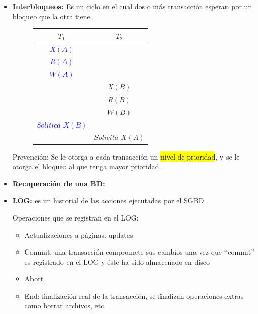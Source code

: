\documentclass{templateNote}
\begin{document}
\begin{itemize}
    \item \textbf{Interbloqueos:} Es un ciclo en el cual dos o más transacción esperan por un bloqueo que la otra tiene.
    
    \begin{figure}[H]
        \centering
        \begin{tabular}{|c|c|}
            \hline
            \textbf{$T_1$} & \textbf{$T_2$} \\ \hline
            \textcolor{blue}{$X(A)$} & \\
            \textcolor{blue}{$R(A)$} & \\
            \textcolor{blue}{$W(A)$} & \\
            & \textcolor{green!80!black}{$X(B)$} \\
            & \textcolor{green!80!black}{$R(B)$} \\
            & \textcolor{green!80!black}{$W(B)$} \\
            \textcolor{blue}{\textit{$Solitica$  ${X(B)}$}} & \\
            & \textcolor{green!80!black}{\textit{$Solicita$ ${X(A)}$}} \\ \hline
        \end{tabular}
    \end{figure}

    Prevención: Se le otorga a cada transacción un \hl{nivel de prioridad}, y se le otorga el bloqueo al que tenga mayor prioridad.

    \newpage
    \item \textbf{Recuperación de una BD:} 
    
    \item \textbf{LOG:} es un historial de las acciones ejecutadas por el SGBD.
    
    Operaciones que se registran en el LOG:
    \begin{itemize}
        \item Actualizaciones a páginas: updates.
        
        \item Commit: una transacción compromete sus cambios una vez que “commit” es registrado en el LOG y éste ha sido almacenado en disco
        
        \item Abort
        
        \item End: finalización real de la transacción, se finalizan operaciones extras como borrar archivos, etc.
        

\end{itemize}
\end{itemize}
\end{document}
